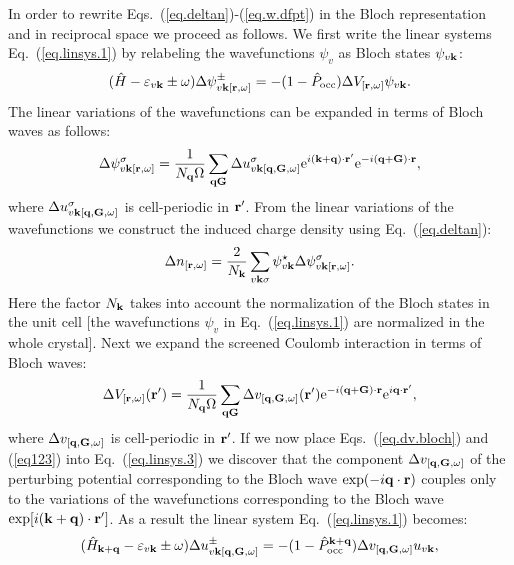 \documentclass[twocolumn,prb,showpacs,superscriptaddress]{revtex4}
\def\s1{\hspace{0.5cm}}
\def\s2{\hspace{1cm}}
\def\w{\omega}
\def\H{\hat{H}}
\def\P{\hat{P}_{\rm occ}}
\def\E{\varepsilon}
\def\q{{\bf q}}
\def\s{\sigma}
\def\k{{\bf k}}
\def\G{{\bf G}}
\def\r{{\bf r}}
\def\rp{{\bf r^\prime}}
\begin{document}
In order to rewrite Eqs.\ (\ref{eq.deltan})-(\ref{eq.w.dfpt}) in
the Bloch representation and in reciprocal space we proceed as follows.
We first write the linear systems Eq.\ (\ref{eq.linsys.1})
by relabeling the wavefunctions $\psi_v$ as Bloch states $\psi_{v\k}$:
  \begin{equation}\label{eq.linsys.3}
  (\H-\E_{v\k}\pm\w) \Delta \psi^\pm_{v\k[\r,\w]}  = -(1-\P)  \Delta V_{[\r,\w]} \psi_{v\k}.
  \end{equation}
The linear variations of the wavefunctions can be expanded in terms
of Bloch waves as follows:
  \begin{equation}\label{eq123}
  \Delta \psi^\sigma_{v\k[\r,\w]} = \frac{1}{N_\q\Omega} \sum_{\q\G} \Delta u^\sigma_{v\k[\q,\G,\w]}
  {\rm e}^{i(\k+\q)\cdot\rp} {\rm e}^{-i(\q+\G)\cdot\r},
  \end{equation}
where $\Delta u^\sigma_{v\k[\q,\G,\w]}$ is cell-periodic in $\rp$.
From the linear variations of the wavefunctions we construct the
induced charge density using Eq.\ (\ref{eq.deltan}):
  \begin{equation}\label{eq.ch}
  \Delta n_{[\r,\w]} = \frac{2}{N_\k}\sum_{v\k\s} \psi_{v\k}^\star  \Delta \psi^\s_{v\k[\r,\w]}.
  \end{equation}
Here the factor $N_\k$ takes into account the normalization of
the Bloch states in the unit cell [the 
wavefunctions $\psi_v$ in Eq.\ (\ref{eq.linsys.1}) are normalized 
in the whole crystal].
Next we expand the screened Coulomb interaction in terms
of Bloch waves: 
  \begin{equation}\label{eq.dv.bloch}
  \Delta V_{[\r,\w]} (\rp) = \frac{1}{N_\q\Omega}  \sum_{\q\G} \Delta v_{[\q,\G,\w]}(\rp) 
   {\rm e}^{-i(\q+\G)\cdot\r} {\rm e}^{i\q\cdot\rp}, 
  \end{equation}
where $\Delta v_{[\q,\G,\w]}$ is cell-periodic in $\rp$.
If we now place Eqs.\ (\ref{eq.dv.bloch}) and (\ref{eq123}) into Eq.\ (\ref{eq.linsys.3})
we discover that the component $\Delta v_{[\q,\G,\w]}$ of the
perturbing potential corresponding to the Bloch wave ${\rm exp}(-i\q\cdot\r)$
couples only to the variations of the wavefunctions corresponding to
the Bloch wave ${\rm exp}[i(\k+\q)\cdot\rp]$.
As a result the linear system Eq.\ (\ref{eq.linsys.1}) becomes:
  \begin{equation}\label{eq.linsys.4}
  (\H_{\k+\q}-\E_{v\k}\pm\w) \Delta u^\pm_{v\k[\q,\G,\w]}  = -(1-\P^{\k+\q}) \Delta v_{[\q,\G,\w]} u_{v\k},
  \end{equation}
\end{document}
